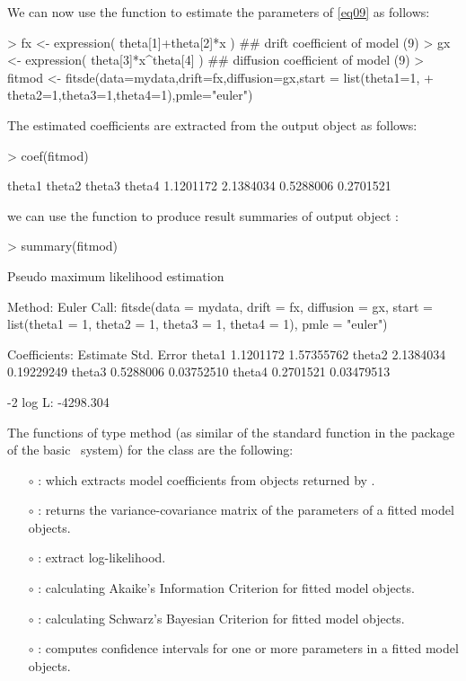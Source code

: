 We can now use the function  to estimate the parameters of \eqref{eq09} as follows:
\begin{Schunk}
\begin{Sinput}
> fx <- expression( theta[1]+theta[2]*x ) ## drift coefficient of model (9)
> gx <- expression( theta[3]*x^theta[4] ) ## diffusion coefficient of model (9)
> fitmod <- fitsde(data=mydata,drift=fx,diffusion=gx,start = list(theta1=1,
+                  theta2=1,theta3=1,theta4=1),pmle="euler")
\end{Sinput}
\end{Schunk}
The estimated coefficients are extracted from the output object  as follows:
\begin{Schunk}
\begin{Sinput}
> coef(fitmod)
\end{Sinput}
\begin{Soutput}
   theta1    theta2    theta3    theta4
1.1201172 2.1384034 0.5288006 0.2701521
\end{Soutput}
\end{Schunk}
we can use the  function to produce result summaries of output object :
\begin{Schunk}
\begin{Sinput}
> summary(fitmod)
\end{Sinput}
\begin{Soutput}
Pseudo maximum likelihood estimation

Method:  Euler
Call:
fitsde(data = mydata, drift = fx, diffusion = gx, start = list(theta1 = 1,
    theta2 = 1, theta3 = 1, theta4 = 1), pmle = "euler")

Coefficients:
        Estimate Std. Error
theta1 1.1201172 1.57355762
theta2 2.1384034 0.19229249
theta3 0.5288006 0.03752510
theta4 0.2701521 0.03479513

-2 log L: -4298.304
\end{Soutput}
\end{Schunk}
The functions of type  method (as similar of the standard  function in the  package of the basic \R~system) for the class  are the following:
\begin{itemize}
  \item [$\circ$] : which extracts model coefficients from objects returned by .
  \item [$\circ$] : returns the variance-covariance matrix of the parameters of a fitted model objects.
  \item [$\circ$] : extract log-likelihood.
  \item [$\circ$] : calculating Akaike's Information Criterion for fitted model objects.
  \item [$\circ$] : calculating Schwarz's Bayesian Criterion for fitted model objects.
  \item [$\circ$] : computes confidence intervals for one or more parameters in a fitted model objects.
\end{itemize}
